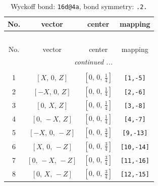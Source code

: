\documentclass[fleqn,8pt]{jsarticle}
\begin{document}
\begin{longtable}{cccc}
\caption{Wyckoff bond: {\tt 16d@4a}, bond symmetry: {\tt .2.}}
 \\
 \hline \hline
No. & vector & center & mapping \\ \hline \endfirsthead

\multicolumn{3}{l}{\tablename\ \thetable{}} \\
 \hline \hline
No. & vector & center & mapping \\ \hline \endhead

 \hline \hline
\multicolumn{3}{r}{\footnotesize\it continued ...} \\ \endfoot

 \hline \hline
\multicolumn{3}{r}{} \\ \endlastfoot

1 & $\left[ X,\, 0,\, Z \right]$ & $\left[ 0,\, 0,\, \frac{1}{4} \right]$ & {\tt [1,-5]} \\ \hline
2 & $\left[ - X,\, 0,\, Z \right]$ & $\left[ 0,\, 0,\, \frac{1}{4} \right]$ & {\tt [2,-6]} \\ \hline
3 & $\left[ 0,\, X,\, Z \right]$ & $\left[ 0,\, 0,\, \frac{1}{4} \right]$ & {\tt [3,-8]} \\ \hline
4 & $\left[ 0,\, - X,\, Z \right]$ & $\left[ 0,\, 0,\, \frac{1}{4} \right]$ & {\tt [4,-7]} \\ \hline
5 & $\left[ - X,\, 0,\, - Z \right]$ & $\left[ 0,\, 0,\, \frac{3}{4} \right]$ & {\tt [9,-13]} \\ \hline
6 & $\left[ X,\, 0,\, - Z \right]$ & $\left[ 0,\, 0,\, \frac{3}{4} \right]$ & {\tt [10,-14]} \\ \hline
7 & $\left[ 0,\, - X,\, - Z \right]$ & $\left[ 0,\, 0,\, \frac{3}{4} \right]$ & {\tt [11,-16]} \\ \hline
8 & $\left[ 0,\, X,\, - Z \right]$ & $\left[ 0,\, 0,\, \frac{3}{4} \right]$ & {\tt [12,-15]} \\
\end{longtable}
\renewcommand{\arraystretch}{1.2}
\end{document}
